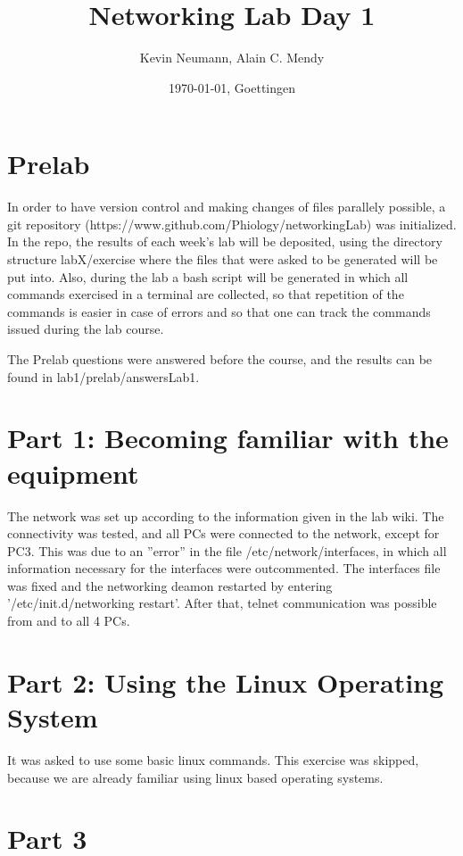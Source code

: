 \documentclass[a4paper, 11pt]{article}
\title{Networking Lab Day 1}
\author{Kevin Neumann, Alain C. Mendy}
\date{\today{}, Goettingen}
\begin{document}
\maketitle
\newpage
\tableofcontents
\newpage
\section{Prelab}

In order to have version control and making changes of files parallely possible, a git repository (https://www.github.com/Phiology/networkingLab)
was initialized. In the repo, the results of each week's lab will be deposited, using the directory structure labX/exercise where the files that 
were asked to be generated will be put into. Also, during the lab a bash script will be generated in which all commands exercised 
in a terminal are collected, so that repetition of the commands is easier in case of errors and so that one can track the commands
issued during the lab course.
 
The Prelab questions were answered before the course, and the results can be found in lab1/prelab/answersLab1.

\section{Part 1: Becoming familiar with the equipment}

The network was set up according to the information given in the lab wiki. The connectivity was tested, and all
PCs were connected to the network, except for PC3. This was due to an ''error'' in the file /etc/network/interfaces,
in which all information necessary for the interfaces were outcommented. The interfaces file was fixed and the networking deamon
restarted by entering '/etc/init.d/networking restart'. After that, telnet communication was possible from and to all
4 PCs.

\section{Part 2: Using the Linux Operating System}

It was asked to use some basic linux commands. This exercise was skipped, because we are already familiar using linux based operating systems.

\section{Part 3}
\end{document}
